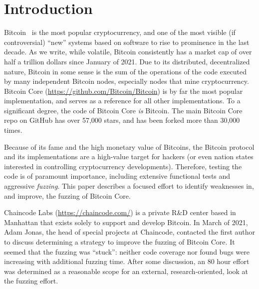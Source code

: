 \section{Introduction}

Bitcoin~\cite{nakamoto2008bitcoin} is the most popular cryptocurrency, and one of the most visible (if controversial) ``new'' systems based on software to rise to prominence in the last decade.  As we write, while volatile, Bitcoin consistently has a market cap of over half a trillion dollars since January of 2021.  Due to its distributed, decentralized nature, Bitcoin in some sense is the sum of the operations of the code executed by many independent Bitcoin nodes, especially nodes that mine cryptocurrency.  Bitcoin Core (\url{https://github.com/Bitcoin/Bitcoin}) is by far the most popular implementation, and serves as a reference for all other implementations.  To a significant degree, the code of Bitcoin Core \emph{is} Bitcoin.  The main Bitcoin Core repo on GitHub has over 57,000 stars, and has been forked more than 30,000 times.

Because of its fame and the high monetary value of Bitcoins, the Bitcoin protocol and its implementations are a high-value target for hackers (or even nation states interested in controlling cryptocurrency developments).  Therefore, testing the code is of paramount importance, including extensive functional tests and aggressive \emph{fuzzing}.  This paper describes a focused effort to identify weaknesses in, and improve, the fuzzing of Bitcoin Core.


Chaincode Labs (\url{https://chaincode.com/}) is a private R\&D center based in Manhattan that exists solely to support and develop Bitcoin.  In March of 2021, Adam Jonas, the head of special projects at Chaincode, contacted the first author to discuss determining a strategy to improve the fuzzing of Bitcoin Core.  It seemed that the fuzzing was ``stuck'': neither code coverage nor found bugs were increasing with additional fuzzing time.  After some discussion, an 80 hour effort was determined as a reasonable scope for an external, research-oriented, look at the fuzzing effort.


